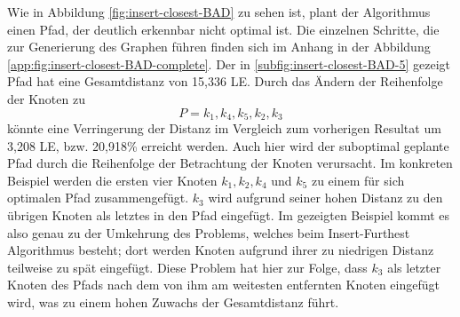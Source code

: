 Wie in Abbildung \vref{fig:insert-closest-BAD} zu sehen ist, plant der Algorithmus einen Pfad, der deutlich erkennbar nicht optimal ist.
Die einzelnen Schritte, die zur Generierung des Graphen führen finden sich im Anhang in der Abbildung \vref{app:fig:insert-closest-BAD-complete}.
Der in \vref{subfig:insert-closest-BAD-5} gezeigt Pfad hat eine Gesamtdistanz von 15,336 \ac{LE}.
Durch das Ändern der Reihenfolge der Knoten zu
    $$P=k_1, k_4, k_5, k_2, k_3$$ 
könnte eine Verringerung der Distanz im Vergleich zum vorherigen Resultat um 3,208 \ac{LE}, bzw. 20,918\% erreicht werden.
Auch hier wird der suboptimal geplante Pfad durch die Reihenfolge der Betrachtung der Knoten verursacht.
Im konkreten Beispiel werden die ersten vier Knoten $k_1, k_2, k_4$ und $k_5$ zu einem für sich optimalen Pfad zusammengefügt.
$k_3$ wird aufgrund seiner hohen Distanz zu den übrigen Knoten als letztes in den Pfad eingefügt.
Im gezeigten Beispiel kommt es also genau zu der Umkehrung des Problems, welches beim Insert-Furthest Algorithmus besteht; dort werden Knoten aufgrund ihrer zu niedrigen Distanz teilweise zu spät eingefügt.
Diese Problem hat hier zur Folge, dass $k_3$ als letzter Knoten des Pfads nach dem von ihm am weitesten entfernten Knoten eingefügt wird, was zu einem hohen Zuwachs der Gesamtdistanz führt.